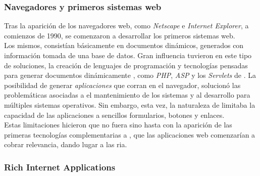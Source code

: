 \subsubsection{Navegadores y primeros sistemas web}
\label{subsubsec:intro:about_web:web}

Tras la aparición de los navegadores web, como \emph{Netscape} e \emph{Internet Explorer},
a comienzos de 1990, se comenzaron a desarrollar los primeros sistemas web.\\
Los mismos, consistían básicamente en documentos dinámicos, generados con información
tomada de una base de datos. Gran influencia tuvieron en este tipo de soluciones, la
creación de lenguajes de programación y tecnologías pensadas para generar documentos
\html dinámicamente , como \emph{PHP}, \emph{ASP}
y los \emph{Servlets} de \java.
La posibilidad de generar \emph{aplicaciones} que corran en el navegador, solucionó las
problemáticas asociadas a el mantenimiento de los sistemas y al desarrollo para múltiples
sistemas operativos. Sin embargo, esta vez, la naturaleza de \html limitaba la capacidad
de las aplicaciones a sencillos formularios, botones y enlaces.\\
Estas limitaciones hicieron que no fuera sino hasta con la aparición de las primeras
tecnologías complementarias a \html, que las aplicaciones web comenzarían a cobrar
relevancia, dando lugar a las \ac{ria}.

\subsubsection{Rich Internet Applications}
\label{subsubsec:intro:about_web:rias}

